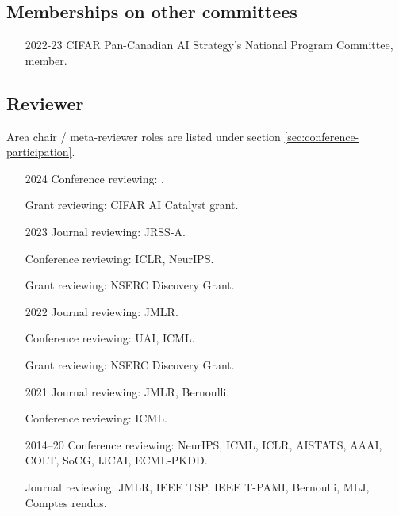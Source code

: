 \documentclass[10pt]{article}
\begin{document}
\subsection{Memberships on other committees} %
\begin{itemize}[leftmargin=5em]
\item[2022-23] {CIFAR Pan-Canadian AI Strategy's National Program Committee, member.}
\end{itemize}

%

\subsection{Reviewer} \label{sec:reviewer} %

Area chair / meta-reviewer roles are listed under section \ref{sec:conference-participation}.

\begin{itemize}[leftmargin=5em]
  \item[2024] Conference reviewing: .
  \item[] Grant reviewing: CIFAR AI Catalyst grant.
  \item[2023] Journal reviewing: {JRSS-A}.
  \item[    ] Conference reviewing: {ICLR, NeurIPS}.
  \item[] Grant reviewing: NSERC Discovery Grant.
  \item[2022] Journal reviewing: {JMLR}.
  \item[    ] Conference reviewing: {UAI}, {ICML}.
  \item[    ] Grant reviewing: NSERC Discovery Grant.
  \item[2021] Journal reviewing: {JMLR}, {Bernoulli}.
  \item[] Conference reviewing: ICML.
  \item[2014--20] Conference reviewing: NeurIPS, ICML, ICLR, AISTATS, AAAI, COLT, SoCG, IJCAI, ECML-PKDD.
  \item[] Journal reviewing: JMLR, IEEE TSP, IEEE T-PAMI, Bernoulli, MLJ, Comptes rendus.
\end{itemize}
\end{document}
